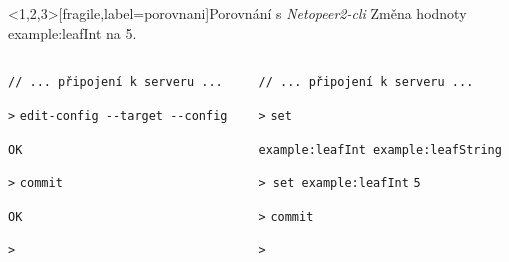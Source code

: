 \documentclass[czech,aspectratio=169]{beamer}
\begin{document}
\begin{frame}<1,2,3>[fragile,label=porovnani]{Porovnání s \textit{Netopeer2-cli}}
    Změna hodnoty example:leafInt na 5.
    \vfill
    \begin{columns}
        \pause{}
        \begin{column}{.47\textwidth}
            \verb¨// ... připojení k serveru ...¨

            \verb¨>¨\pause{} \verb|edit-config --target --config|

            \pause{}
            \verb¨OK¨

            \verb¨>¨\pause{} \verb|commit|

            \pause{}
            \verb¨OK¨

            \verb¨>¨

        \end{column}
        \pause{}
        \begin{column}{.47\textwidth}
            \verb¨// ... připojení k serveru ...¨

            \verb¨>¨\pause{} \verb|set |

            \pause{}
            \verb¨example:leafInt example:leafString¨

            \verb¨> set example:leaf¨\pause{}\verb|I|\pause{}\verb|nt|\pause{} \verb|5|

            \pause{}
            \verb¨>¨\pause{} \verb|commit|

            \verb¨>¨
        \end{column}
    \end{columns}
\end{frame}
\end{document}
